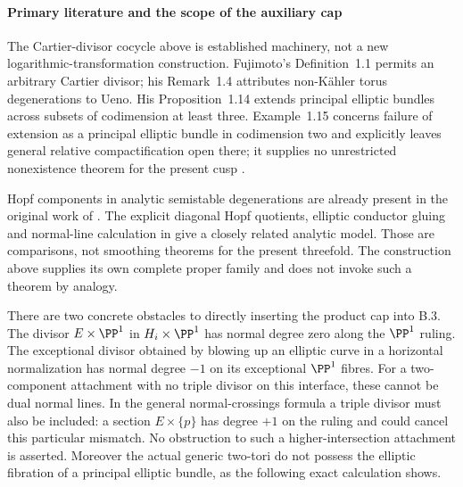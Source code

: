 \paragraph{Primary literature and the scope of the auxiliary cap}
The Cartier-divisor cocycle above is established machinery, not
a new logarithmic-transformation construction.  Fujimoto's
Definition~1.1 permits an arbitrary Cartier divisor; his
Remark~1.4 attributes non-K\"ahler torus degenerations to Ueno.
His Proposition~1.14 extends principal elliptic bundles across
subsets of codimension at least three.  Example~1.15 concerns
failure of extension as a principal elliptic bundle in
codimension two and explicitly leaves general relative
compactification open there; it supplies no unrestricted
nonexistence theorem for the present cusp
\citep[pp.~85--86, 93--94]{Fujimoto1990AB}.

Hopf components in analytic semistable degenerations are already
present in the original work of
\citet[Theorem 1.4, preprint p.~7, and Example 2.1, p.~13]{Nishiguchi1988IIRoot}.
The explicit diagonal Hopf quotients, elliptic conductor gluing
and normal-line calculation in
\citet[Propositions 3.1--3.4, preprint pp.~6--9]{SS00}
give a closely related analytic model.  Those are comparisons,
not smoothing theorems for the present threefold.  The construction
above supplies its own complete proper family and does not invoke
such a theorem by analogy.

There are two concrete obstacles to directly inserting the product
cap into B.3.  The divisor $E\times\PP^1$ in
$H_i\times\PP^1$ has normal degree zero along the $\PP^1$
ruling.  The exceptional divisor obtained by blowing up an
elliptic curve in a horizontal normalization has normal degree
$-1$ on its exceptional $\PP^1$ fibres.  For a two-component
attachment with no triple divisor on this interface, these cannot
be dual normal lines.  In the general normal-crossings formula
a triple divisor must also be included: a section
$E\times\{p\}$ has degree $+1$ on the ruling and could cancel
this particular mismatch.  No obstruction to such a higher-intersection
attachment is asserted.  Moreover the actual generic two-tori
do not possess the elliptic fibration of a principal elliptic
bundle, as the following exact calculation shows.

